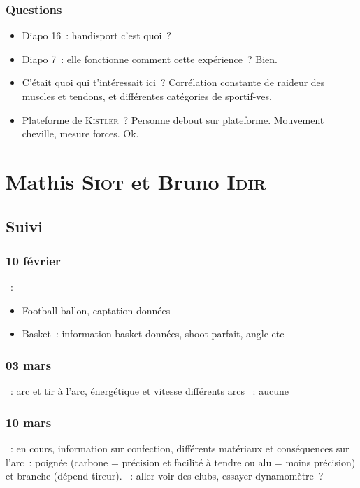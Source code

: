 \documentclass[a4paper, 11pt, final, garamond]{book}
\begin{document}
\subsection{Questions}
\begin{itemize}
  \item Diapo 16~: handisport c'est quoi~?
  \item Diapo 7~: elle fonctionne comment cette expérience~? Bien.
  \item C'était quoi qui t'intéressait ici~? Corrélation constante de raideur
    des muscles et tendons, et différentes catégories de sportif-ves.
  \item Plateforme de \textsc{Kistler}~? Personne debout sur plateforme.
    Mouvement cheville, mesure forces. Ok.
\end{itemize}

\chapter{Mathis \textsc{Siot} et Bruno \textsc{Idir}}
\label{ch:mathisbruno}
\section{Suivi}
\subsection{10 février}
\begin{itemize}
  ~:
    \begin{itemize}
      \item Football ballon, captation données
      \item Basket~: information basket données, shoot parfait, angle etc
    \end{itemize}
\end{itemize}

\subsection{03 mars}
\begin{itemize}
    ~: arc et tir à l'arc, énergétique et vitesse différents arcs
    ~: aucune
\end{itemize}

\subsection{10 mars}
\begin{itemize}
    ~: en cours, information sur confection, différents matériaux
        et conséquences sur l'arc~: poignée (carbone = précision et facilité à
        tendre ou alu = moins précision) et branche (dépend tireur).
    ~: aller voir des clubs, essayer dynamomètre~?
\end{itemize}
\end{document}
